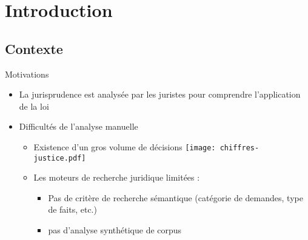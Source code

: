 \section{Introduction}

\subsection{Contexte}
\begin{frame}[t]{\mysubsectiontitle}
	Motivations
	\begin{itemize}
		\item La jurisprudence est analysée par les juristes pour comprendre l'application de la loi 
	    \item Difficultés de l'analyse manuelle
	    \begin{itemize}
	    	\item Existence d'un gros volume de décisions 
	    		\texttt{[image: chiffres-justice.pdf]}   	
			\item Les moteurs de recherche juridique limitées : 
			\begin{itemize}
				\item Pas de critère de recherche sémantique (catégorie de demandes, type de faits, etc.)
				\item pas d'analyse synthétique de corpus
			\end{itemize}
	    \end{itemize}
	\end{itemize}
\end{frame}

